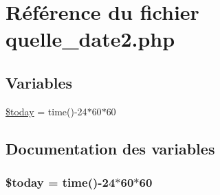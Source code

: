 \hypertarget{quelle__date2_8php}{
\section{R\'{e}f\'{e}rence du fichier quelle\_\-date2.php}
\label{quelle__date2_8php}
}
\subsection*{Variables}
\begin{CompactItemize}
\item 
\hyperlink{quelle__date2_8php_a0}{\$today} = time()-24$\ast$60$\ast$60
\end{CompactItemize}


\subsection{Documentation des variables}
\hypertarget{quelle__date2_8php_a0}{
\subsubsection[\$today]{\setlength{\rightskip}{0pt plus 5cm}\$today = time()-24$\ast$60$\ast$60}}
\label{quelle__date2_8php_a0}


